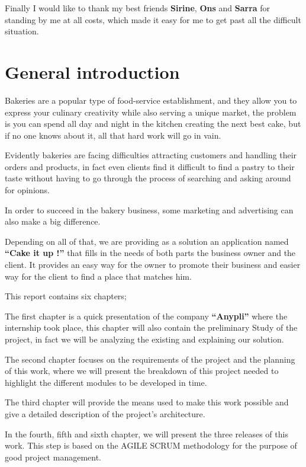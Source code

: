 \documentclass[12pt,a4paper]{report}
\begin{document}
	  Finally I would like to thank my best friends \textbf{Sirine}, \textbf{Ons} and \textbf{Sarra} for standing by me at all costs, which made it easy for me to get past all the difficult situation. \\
	\cleardoublepage
	\tableofcontents
	\cleardoublepage
	\listoffigures	
	\cleardoublepage
	\listoftables	
	\clearpage 
	\printacronyms[include-classes=abbrev,name=List of Abbreviations]
	\cleardoublepage
	\setcounter{page}{1}
	
	
	\chapter*{\centering General introduction}
	Bakeries are a popular type of food-service establishment, and they allow you to express your culinary creativity while also serving a unique market, the problem is you can spend all day and night in the kitchen creating the next best cake, but if no one knows about it, all that hard work will go in vain.  \par 
	Evidently bakeries are facing difficulties attracting customers and handling their orders and products, in fact even clients find it difficult to find a pastry to their taste without having to go through the process of searching and asking around for opinions.\par
	In order to succeed in the bakery business,  some marketing and advertising can also make a big difference.\par
	
	Depending on all of that, we are providing as a solution an application named \textbf{``Cake it up !''} that fills in the needs of both parts the business owner and the client. It provides an easy way for the owner to promote their business and easier way for the client to find a place that matches him.\par
	This report contains six chapters;\par
	The first chapter is a quick presentation of the company \textbf{``Anypli''} where the internship took place, this chapter will also contain the preliminary Study of the project, in fact we will be analyzing the existing and explaining our solution.  \par
	The second chapter focuses on the requirements of the project and the planning of this work, where we will present the breakdown of this project needed to highlight the different modules to be developed in time.\par
	The third chapter will provide the means used to make this work possible and give a detailed description of the project's architecture.
	\par
	In the fourth, fifth and sixth chapter, we will present the three releases of this work. This step is based on the AGILE SCRUM methodology for the purpose of good project management.\par
	
\end{document}
